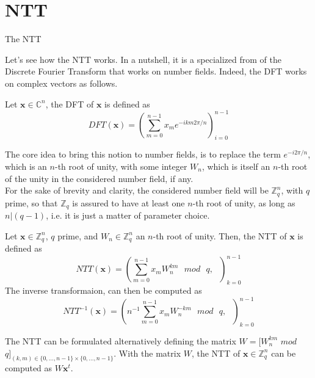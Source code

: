 \begin{definition}

\end{definition}

\section{NTT}\label{sec:bg:ntt}

The NTT

Let's see how the NTT works. In a nutshell, it is a specialized from of the Discrete Fourier Transform that works on number fields. Indeed, the DFT works on complex vectors as follows.

\begin{definition}
Let $\mathbf{x}\in\mathbb{C}^n$, the DFT of $\mathbf{x}$ is defined as
\begin{equation*}
DFT(\mathbf{x})=\left(\sum_{m=0}^{n-1}x_me^{-ikm2\pi/n} \right)_{i=0}^{n-1}
\end{equation*}
\end{definition}

The core idea to bring this notion to number fields, is to replace the term $e^{-i2\pi/n}$, which is an $n$-th root of unity, with some integer $W_n$, which is itself an $n$-th root of the unity in the considered number field, if any.\\
For the sake of brevity and clarity, the considered number field will be $\mathbb{Z}_q^n$, with $q$ prime, so that $\mathbb{Z}_q$ is assured to have at least one $n$-th root of unity, as long as $n|(q-1)$, i.e. it is just a matter of parameter choice. %

\begin{definition}[NTT]
Let $\mathbf{x}\in\mathbb{Z}_q^n$, $q$ prime, and $W_n\in\mathbb{Z}_q^n$ an $n$-th root of unity. Then, the NTT of $\mathbf{x}$ is defined as
\begin{equation*}
NTT(\mathbf{x})=\left(\sum_{m=0}^{n-1}x_mW_n^{km}\text{ }mod\text{ }q,\text{ }\right)_{k=0}^{n-1}  
\end{equation*}
The inverse transformaion, can then be computed as
\begin{equation*}
NTT^{-1}(\mathbf{x})=\left(n^{-1}\sum_{m=0}^{n-1}x_mW_n^{-km}\text{ }mod\text{ }q,\text{ }\right)_{k=0}^{n-1}
\end{equation*} 
\end{definition}

\begin{remark}
The NTT can be formulated alternatively defining the matrix $W=[W_n^{km}$ $mod$ $q]_{(k,m)\in\{0,\ldots,n-1\}\times\{0,\ldots,n-1\}}$. With the matrix $W$, the NTT of $\mathbf{x}\in\mathbb{Z}_q^n$ can be computed as $W\mathbf{x}^t$.
\end{remark}

